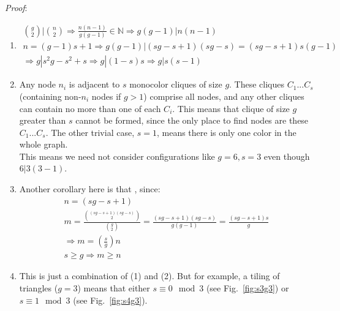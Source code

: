 \documentclass[11pt, oneside]{article} 	%
\begin{document}
\emph{Proof}:
\begin{enumerate}
\item 
\begin{align}
{g \choose 2} \bigg| {n \choose 2} \Rightarrow \frac{n(n-1)}{g(g-1)} \in \mathbb{N} \Rightarrow g(g-1) | n(n-1) \\
 n = (g-1)s+1 \Rightarrow g(g-1) \big| (sg-s+1)(sg-s) = (sg-s+1)s(g-1)\\
\Rightarrow g | s^2g - s^2 + s \Rightarrow g | (1-s)s \Rightarrow g | s(s-1) 
\end{align}
\item Any node $n_i$ is adjacent to $s$ monocolor cliques of size $g$. These cliques $C_1 ... C_s$ (containing non-$n_i$ nodes if $g > 1$) comprise all nodes, and any other cliques can contain no more than one of each $C_i$. This means that clique of size $g$ greater than $s$ cannot be formed, since the only place to find nodes are these $C_1 ... C_s$. The other trivial case, $s=1$, means there is only one color in the whole graph. 
\\

This means we need not consider configurations like $g = 6, s=3$ even though $6 | 3(3-1)$.

\item Another corollary here is that , since:
\begin{align}
n = (sg - s + 1) \\
m = \frac{{(sg - s + 1)(sg-s) \choose 2}}{{g \choose 2}} = \frac{(sg-s+1)(sg-s)}{g(g-1)} = \frac{(sg-s+1)s}{g} \\
\Rightarrow m = (\frac{s}{g})n\\
s \geq g \Rightarrow m \geq n
\end{align}
\item This is just a combination of (1) and (2). But for example, a tiling of triangles ($g=3$) means that either $s \equiv 0 \mod 3$ (see Fig.~\ref{fig:s3g3})
 or $s \equiv 1 \mod 3$ (see Fig.~\ref{fig:s4g3}). 
\end{enumerate}
\end{document}
